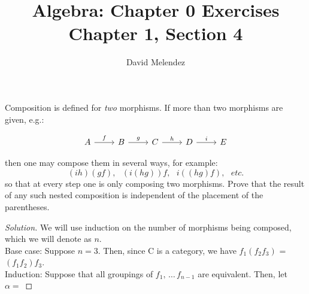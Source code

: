 \documentclass[12pt]{article}
\newenvironment{problem}[2][Problem]{\begin{trivlist}
\item[\hskip \labelsep {\bfseries #1}\hskip \labelsep {\bfseries #2.}]}{\end{trivlist}}
\newenvironment{solution}
  {\renewcommand\qedsymbol{$\blacksquare$}\begin{proof}[Solution]}
        {\end{proof}}
\begin{document}
\title{Algebra: Chapter 0 Exercises\\ \large Chapter 1, Section 4}
\author{David Melendez}
\maketitle

\begin{problem}{4.1}
    Composition is defined for \textit{two} morphisms. 
    If more than two morphisms are given, e.g.:

    \[\begin{tikzcd}
        A \ar[r,"f"] & B \ar[r,"g"] & C \ar[r,"h"] & D \ar[r,"i"] & E
    \end{tikzcd}\]

    then one may compose them in several ways, for example:
    \begin{equation*}
        (ih)(gf),\,\,\,\, (i(hg))f,\,\,\,\, i((hg)f),\,\,\,\, etc.
    \end{equation*}
    so that at every step one is only composing two morphisms. 
    Prove that the result of any such nested composition is independent of the placement of the parentheses.
\end{problem}
\begin{solution}
  We will use induction on the number of morphisms being composed, which we will denote as $n$.\\
  Base case: Suppose $n=3$. 
  Then, since C is a category, we have $f_1(f_2f_3)$ = $(f_1f_2)f_3$.\\
  Induction: Suppose that all groupings of $f_1,\, \ldots\, f_{n-1}$ are equivalent.
  Then, let $\alpha=$
\end{solution}
\end{document}
